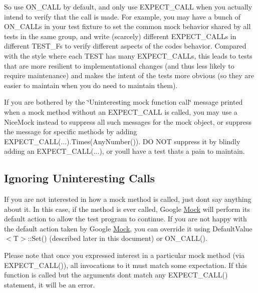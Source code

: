 So use {\ttfamily O\+N\+\_\+\+C\+A\+LL} by default, and only use {\ttfamily E\+X\+P\+E\+C\+T\+\_\+\+C\+A\+LL} when you actually intend to verify that the call is made. For example, you may have a bunch of {\ttfamily O\+N\+\_\+\+C\+A\+LL}s in your test fixture to set the common mock behavior shared by all tests in the same group, and write (scarcely) different {\ttfamily E\+X\+P\+E\+C\+T\+\_\+\+C\+A\+LL}s in different {\ttfamily T\+E\+S\+T\+\_\+F}s to verify different aspects of the code\textquotesingle{}s behavior. Compared with the style where each {\ttfamily T\+E\+ST} has many {\ttfamily E\+X\+P\+E\+C\+T\+\_\+\+C\+A\+LL}s, this leads to tests that are more resilient to implementational changes (and thus less likely to require maintenance) and makes the intent of the tests more obvious (so they are easier to maintain when you do need to maintain them).

If you are bothered by the \char`\"{}\+Uninteresting mock function call\char`\"{} message printed when a mock method without an {\ttfamily E\+X\+P\+E\+C\+T\+\_\+\+C\+A\+LL} is called, you may use a {\ttfamily Nice\+Mock} instead to suppress all such messages for the mock object, or suppress the message for specific methods by adding {\ttfamily E\+X\+P\+E\+C\+T\+\_\+\+C\+A\+LL(...).Times(\+Any\+Number())}. DO N\+OT suppress it by blindly adding an {\ttfamily E\+X\+P\+E\+C\+T\+\_\+\+C\+A\+LL(...)}, or you\textquotesingle{}ll have a test that\textquotesingle{}s a pain to maintain.

\subsection*{Ignoring Uninteresting Calls}

If you are not interested in how a mock method is called, just don\textquotesingle{}t say anything about it. In this case, if the method is ever called, Google \hyperlink{classMock}{Mock} will perform its default action to allow the test program to continue. If you are not happy with the default action taken by Google \hyperlink{classMock}{Mock}, you can override it using {\ttfamily Default\+Value$<$T$>$\+::\+Set()} (described later in this document) or {\ttfamily O\+N\+\_\+\+C\+A\+L\+L()}.

Please note that once you expressed interest in a particular mock method (via {\ttfamily E\+X\+P\+E\+C\+T\+\_\+\+C\+A\+L\+L()}), all invocations to it must match some expectation. If this function is called but the arguments don\textquotesingle{}t match any {\ttfamily E\+X\+P\+E\+C\+T\+\_\+\+C\+A\+L\+L()} statement, it will be an error.

